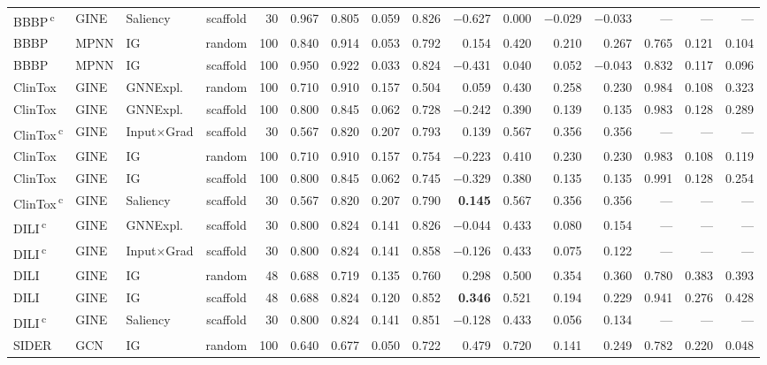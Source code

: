 \begin{table}
{\begin{tabular}{lllcrrrrrrrrrrrr}
BBBP\,\textsuperscript{c} & GINE & Saliency & scaffold & 30 & 0.967 & 0.805 & 0.059 & 0.826 & $-$0.627 & 0.000 & $-$0.029 & $-$0.033 & --- & --- & --- \\
BBBP & MPNN & IG & random & 100 & 0.840 & 0.914 & 0.053 & 0.792 & 0.154 & 0.420 & 0.210 & 0.267 & 0.765 & 0.121 & 0.104 \\
BBBP & MPNN & IG & scaffold & 100 & 0.950 & 0.922 & 0.033 & 0.824 & $-$0.431 & 0.040 & 0.052 & $-$0.043 & 0.832 & 0.117 & 0.096 \\
\addlinespace[2pt]
ClinTox & GINE & GNNExpl. & random & 100 & 0.710 & 0.910 & 0.157 & 0.504 & 0.059 & 0.430 & 0.258 & 0.230 & 0.984 & 0.108 & 0.323 \\
ClinTox & GINE & GNNExpl. & scaffold & 100 & 0.800 & 0.845 & 0.062 & 0.728 & $-$0.242 & 0.390 & 0.139 & 0.135 & 0.983 & 0.128 & 0.289 \\
ClinTox\,\textsuperscript{c} & GINE & Input$\times$Grad & scaffold & 30 & 0.567 & 0.820 & 0.207 & 0.793 & 0.139 & 0.567 & 0.356 & 0.356 & --- & --- & --- \\
ClinTox & GINE & IG & random & 100 & 0.710 & 0.910 & 0.157 & 0.754 & $-$0.223 & 0.410 & 0.230 & 0.230 & 0.983 & 0.108 & 0.119 \\
ClinTox & GINE & IG & scaffold & 100 & 0.800 & 0.845 & 0.062 & 0.745 & $-$0.329 & 0.380 & 0.135 & 0.135 & 0.991 & 0.128 & 0.254 \\
ClinTox\,\textsuperscript{c} & GINE & Saliency & scaffold & 30 & 0.567 & 0.820 & 0.207 & 0.790 & \textbf{0.145} & 0.567 & 0.356 & 0.356 & --- & --- & --- \\
\addlinespace[2pt]
DILI\,\textsuperscript{c} & GINE & GNNExpl. & scaffold & 30 & 0.800 & 0.824 & 0.141 & 0.826 & $-$0.044 & 0.433 & 0.080 & 0.154 & --- & --- & --- \\
DILI\,\textsuperscript{c} & GINE & Input$\times$Grad & scaffold & 30 & 0.800 & 0.824 & 0.141 & 0.858 & $-$0.126 & 0.433 & 0.075 & 0.122 & --- & --- & --- \\
DILI & GINE & IG & random & 48 & 0.688 & 0.719 & 0.135 & 0.760 & 0.298 & 0.500 & 0.354 & 0.360 & 0.780 & 0.383 & 0.393 \\
DILI & GINE & IG & scaffold & 48 & 0.688 & 0.824 & 0.120 & 0.852 & \textbf{0.346} & 0.521 & 0.194 & 0.229 & 0.941 & 0.276 & 0.428 \\
DILI\,\textsuperscript{c} & GINE & Saliency & scaffold & 30 & 0.800 & 0.824 & 0.141 & 0.851 & $-$0.128 & 0.433 & 0.056 & 0.134 & --- & --- & --- \\
\addlinespace[2pt]
SIDER & GCN & IG & random & 100 & 0.640 & 0.677 & 0.050 & 0.722 & 0.479 & 0.720 & 0.141 & 0.249 & 0.782 & 0.220 & 0.048 \\

\end{tabular}}
\end{table}
